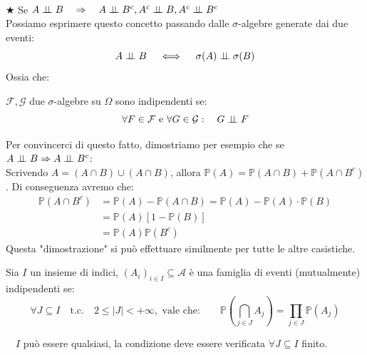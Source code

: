 \\
\(\bigstar\) Se $A\ind B \quad\Rightarrow\quad A\ind B^c, A^c\ind B, A^c\ind B^c$\\
Possiamo esprimere questo concetto passando dalle $\sigma$-algebre generate dai due eventi:
\[A\mathrel{\perp\!\!\!\perp} B \quad \iff\quad\sigma(A)\mathrel{\perp\!\!\!\perp} \sigma (B)\]
Ossia che:
\begin{definizione}
\label{def:3.13}
$\mathcal{F,G}$ due $\sigma$-algebre su $\Omega$ sono indipendenti se:
\[\forall F\in \mathcal{F} \text{ e }\forall G\in\mathcal{G}: \quad G\mathrel{\perp\!\!\!\perp} F\]
\end{definizione}
\noindent Per convincerci di questo fatto, dimostriamo per esempio che se $A\mathrel{\perp\!\!\!\perp} B\Rightarrow A\mathrel{\perp\!\!\!\perp} B^c$:\\
Scrivendo $A = (A\cap B)\cup (A\cap B)$, allora $\mathbb{P}(A) = \mathbb{P}(A\cap B) + \mathbb{P}(A\cap B^c)$. Di conseguenza avremo che:
\begin{align*}
    \mathbb{P}(A\cap B^c)&=\mathbb{P}(A)- \mathbb{P}(A\cap B) = \mathbb{P}(A)- \mathbb{P}(A)\cdot \mathbb{P}(B) \\
    & = \mathbb{P} (A) [1 - \mathbb{P}(B)]\\
    & = \mathbb{P}(A)\mathbb{P}(B^c)
\end{align*}
Questa "dimostrazione" si può effettuare similmente per tutte le altre casistiche.

\begin{definizione}
    Sia $I$ un insieme di indici, $(A_i)_{i\in I}\subseteq\mathcal{A}$ è una famiglia di eventi (mutualmente) indipendenti se:
    \[\forall J\subseteq I\quad\text{t.c.}\quad 2\leq |J| < +\infty, \text{ vale che:}\qquad \mathbb{P}\left(\bigcap_{j\in J}A_j\right) = \prod_{j\in J}\mathbb{P}(A_j)\]
    
    \faWarning $\quad I$ può essere qualsiasi, la condizione deve essere verificata $\forall J\subseteq I$ finito.
\end{definizione}

